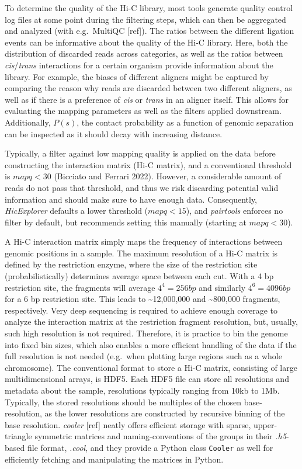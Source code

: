 \documentclass[
  11pt,
  a4paper,
]{scrbook}
\let\oldemph\emph
\renewcommand\emph[1]{\oldemph{\color{gray}#1}}
\begin{document}
To determine the quality of the Hi-C library, most tools generate
quality control log files at some point during the filtering steps,
which can then be aggregated and analyzed (with e.g.~MultiQC {[}ref{]}).
The ratios between the different ligation events can be informative
about the quality of the Hi-C library. Here, both the distribution of
discarded reads across categories, as well as the ratios between
\emph{cis}/\emph{trans} interactions for a certain organism provide
information about the library. For example, the biases of different
aligners might be captured by comparing the reason why reads are
discarded between two different aligners, as well as if there is a
preference of \emph{cis} or \emph{trans} in an aligner itself. This
allows for evaluating the mapping parameters as well as the filters
applied downstream. Additionally, \(P(s)\), the contact probability as a
function of genomic separation can be inspected as it should decay with
increasing distance.

Typically, a filter against low mapping quality is applied on the data
before constructing the interaction matrix (Hi-C matrix), and a
conventional threshold is \(mapq < 30\) (Bicciato and Ferrari 2022).
However, a considerable amount of reads do not pass that threshold, and
thus we risk discarding potential valid information and should make sure
to have enough data. Consequently, \emph{HicExplorer} defaults a lower
threshold (\(mapq < 15\)), and \emph{pairtools} enforces no filter by
default, but recommends setting this manually (starting at
\(mapq < 30\)).

A Hi-C interaction matrix simply maps the frequency of interactions
between genomic positions in a sample. The maximum resolution of a Hi-C
matrix is defined by the restriction enzyme, where the size of the
restriction site (probabilistically) determines average space between
each cut. With a 4 bp restriction site, the fragments will average
\(4^4 = 256 bp\) and similarly \(4^6 = 4096 bp\) for a 6 bp restriction
site. This leads to \textasciitilde12,000,000 and \textasciitilde800,000
fragments, respectively. Very deep sequencing is required to achieve
enough coverage to analyze the interaction matrix at the restriction
fragment resolution, but, usually, such high resolution is not required.
Therefore, it is practice to bin the genome into fixed bin sizes, which
also enables a more efficient handling of the data if the full
resolution is not needed (e.g.~when plotting large regions such as a
whole chromosome). The conventional format to store a Hi-C matrix,
consisting of large multidimensional arrays, is HDF5. Each HDF5 file can
store all resolutions and metadata about the sample, resolutions
typically ranging from 10kb to 1Mb. Typically, the stored resolutions
should be multiples of the chosen base-resolution, as the lower
resolutions are constructed by recursive binning of the base resolution.
\emph{cooler} {[}ref{]} neatly offers efficient storage with sparse,
upper-triangle symmetric matrices and naming-conventions of the groups
in their \emph{.h5}-based file format, \emph{.cool}, and they provide a
Python class \texttt{Cooler} as well for efficiently fetching and
manipulating the matrices in Python.
\end{document}
